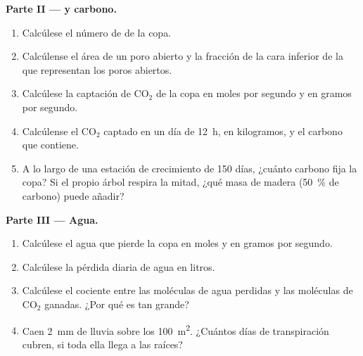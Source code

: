 \begin{problem}
\medskip
\noindent\textbf{Parte II ---  y carbono.}
\begin{enumerate}[resume]
  \item Calcúlese el número de  de la copa.
  \item Calcúlense el área de un poro abierto y la fracción de la cara
        inferior de la  que representan los poros abiertos.
  \item Calcúlese la captación de $\mathrm{CO_2}$ de la copa en moles por
        segundo y en gramos por segundo.
  \item Calcúlense el $\mathrm{CO_2}$ captado en un día de \qty{12}{h}, en
        kilogramos, y el carbono que contiene.
  \item A lo largo de una estación de crecimiento de \qty{150}{} días,
        ¿cuánto carbono fija la copa? Si el propio árbol respira la mitad,
        ¿qué masa de madera (\qty{50}{\%} de carbono) puede añadir?
\end{enumerate}

\medskip
\noindent\textbf{Parte III --- Agua.}
\begin{enumerate}[resume]
  \item Calcúlese el agua que pierde la copa en moles y en gramos por
        segundo.
  \item Calcúlese la pérdida diaria de agua en litros.
  \item Calcúlese el cociente entre las moléculas de agua perdidas y las
        moléculas de $\mathrm{CO_2}$ ganadas. ¿Por qué es tan grande?
  \item Caen \qty{2}{mm} de lluvia sobre los \qty{100}{m^2}. ¿Cuántos días
        de transpiración cubren, si toda ella llega a las raíces?
\end{enumerate}


\end{problem}
